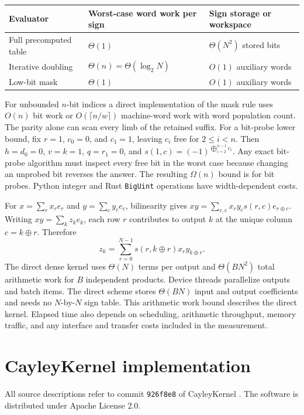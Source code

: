 \documentclass[11pt]{article}
\begin{document}
\begin{center}
\begin{tabular}{@{}lll@{}}
\toprule
Evaluator & Worst-case word work per sign & Sign storage or workspace\\
\midrule
Full precomputed table & \(\Theta(1)\) & \(\Theta(N^2)\) stored bits\\
Iterative doubling & \(\Theta(n)=\Theta(\log_2 N)\) & \(O(1)\) auxiliary words\\
Low-bit mask & \(\Theta(1)\) & \(O(1)\) auxiliary words\\
\bottomrule
\end{tabular}
\end{center}

For unbounded \(n\)-bit indices a direct implementation of the mask
rule uses \(O(n)\) bit work or \(O(\lceil n/w\rceil)\) machine-word
work with word population count. The parity alone can scan every limb
of the retained suffix. For a bit-probe lower bound, fix \(r=1\),
\(c_0=0\), and \(c_1=1\), leaving \(c_i\) free for \(2\leq i<n\).
Then \(h=d_0=0\), \(v=k=1\), \(q=r_1=0\), and
\(s(1,c)=(-1)^{\bigoplus_{i=2}^{n-1}c_i}\). Any exact bit-probe
algorithm must inspect every free bit in the worst case because changing
an unprobed bit reverses the answer. The resulting \(\Omega(n)\)
bound is for bit probes. Python integer and Rust \texttt{BigUint}
operations have width-dependent costs.

For \(x=\sum_r x_r e_r\) and \(y=\sum_c y_c e_c\), bilinearity
gives \(xy=\sum_{r,c} x_r y_c s(r,c)e_{r\oplus c}\).
Writing \(xy=\sum_k z_k e_k\), each row \(r\) contributes to
output \(k\) at the unique column \(c=k\oplus r\). Therefore
\begin{equation}
 z_k=\sum_{r=0}^{N-1}s(r,k\oplus r)x_r y_{k\oplus r}.
 \label{eq:dense}
\end{equation}
The direct dense kernel uses \(\Theta(N)\) terms per output and
\(\Theta(BN^2)\) total arithmetic work for \(B\) independent products.
Device threads parallelize outputs and batch items. The direct scheme
stores \(\Theta(BN)\) input and output coefficients and needs no
\(N\)-by-\(N\) sign table. This arithmetic work bound describes the
direct kernel. Elapsed time also depends on scheduling, arithmetic
throughput, memory traffic, and any interface and transfer costs included
in the measurement.

\section{CayleyKernel implementation}
All source descriptions refer to commit \texttt{926f8e8} of
CayleyKernel \cite{cayley}. The software is distributed under
Apache License 2.0.
\end{document}
